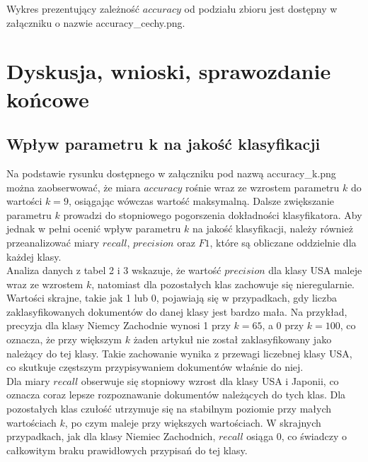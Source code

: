 \documentclass{article}
\begin{document}

Wykres prezentujący zależność \(accuracy\) od podziału zbioru jest dostępny w załączniku o nazwie accuracy\_cechy.png.

\section{Dyskusja, wnioski, sprawozdanie końcowe}
\subsection{Wpływ parametru k na jakość klasyfikacji}
Na podstawie rysunku dostępnego w załączniku pod nazwą accuracy\_k.png można zaobserwować, że miara \(accuracy\) rośnie wraz ze wzrostem parametru \(k\) do wartości \(k = 9\), osiągając wówczas wartość maksymalną. Dalsze zwiększanie parametru \(k\) prowadzi do stopniowego pogorszenia dokładności klasyfikatora. Aby jednak w pełni ocenić wpływ parametru \(k\) na jakość klasyfikacji, należy również przeanalizować miary \(recall\), \(precision\) oraz \(F1\), które są obliczane oddzielnie dla każdej klasy. \\
Analiza danych z tabel 2 i 3 wskazuje, że wartość \(precision\) dla klasy USA maleje wraz ze wzrostem \(k\), natomiast dla pozostałych klas zachowuje się nieregularnie. Wartości skrajne, takie jak 1 lub 0, pojawiają się w przypadkach, gdy liczba zaklasyfikowanych dokumentów do danej klasy jest bardzo mała. Na przykład, precyzja dla klasy Niemcy Zachodnie wynosi 1 przy \(k = 65\), a 0 przy \(k = 100\), co oznacza, że przy większym \(k\) żaden artykuł nie został zaklasyfikowany jako należący do tej klasy. Takie zachowanie wynika z przewagi liczebnej klasy USA, co skutkuje częstszym przypisywaniem dokumentów właśnie do niej. \\ 
Dla miary \(recall\) obserwuje się stopniowy wzrost dla klasy USA i Japonii, co oznacza coraz lepsze rozpoznawanie dokumentów należących do tych klas. Dla pozostałych klas czułość utrzymuje się na stabilnym poziomie przy małych wartościach \(k\), po czym maleje przy większych wartościach. W skrajnych przypadkach, jak dla klasy Niemiec Zachodnich, \(recall\) osiąga 0, co świadczy o całkowitym braku prawidłowych przypisań do tej klasy.\\
\end{document}

